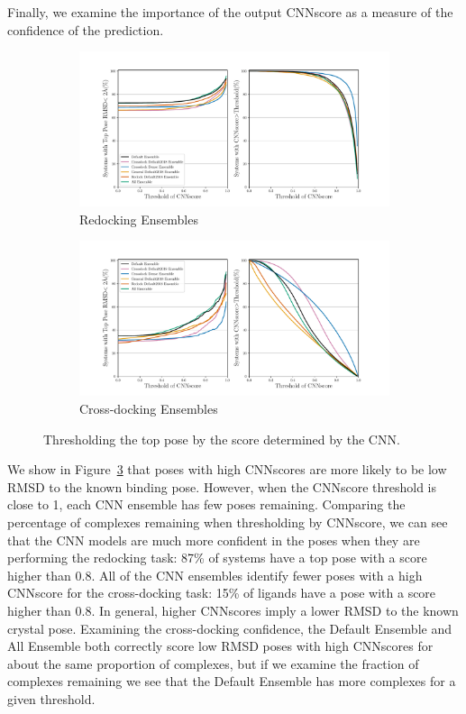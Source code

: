 \documentclass[journal=jcisd8,manuscript=article]{achemso}
\begin{document}
Finally, we examine the importance of the output CNNscore as a measure of the confidence of the prediction. 
\begin{figure}    
        \begin{subfigure}[b]{\textwidth}    
		\centering
		\includegraphics[width=\textwidth]{figures/redocking/thresh_cnnscore_ensembles.pdf}
		\caption{Redocking Ensembles}
		\label{fig:ThreshEnsRD}
        \end{subfigure}    
        \begin{subfigure}[b]{\textwidth}    
		\centering
		\includegraphics[width=\textwidth]{figures/crossdocking/thresh_cnnscore_ensembles.pdf}
		\caption{Cross-docking Ensembles}
                \label{fig:ThreshEnsCD}
        \end{subfigure}
	\caption{Thresholding the top pose by the score determined by the CNN.}
	\label{fig:ScoreThresh}
\end{figure} 

We show in Figure~\ref{fig:ScoreThresh} that poses with high CNNscores are more likely to be low RMSD to the known binding pose. However, when the CNNscore threshold is close to 1, each CNN ensemble has few poses remaining. Comparing the percentage of complexes remaining when thresholding by CNNscore, we can see that the CNN models are much more confident in the poses when they are performing the redocking task: 87\% of systems have a top pose with a score higher than 0.8. All of the CNN ensembles identify fewer poses with a high CNNscore for the cross-docking task: 15\% of ligands have a pose with a score higher than 0.8. In general, higher CNNscores imply a lower RMSD to the known crystal pose. Examining the cross-docking confidence, the Default Ensemble and All Ensemble both correctly score low RMSD poses with high CNNscores for about the same proportion of complexes, but if we examine the fraction of complexes remaining we see that the Default Ensemble has more complexes for a given threshold.
\end{document}
